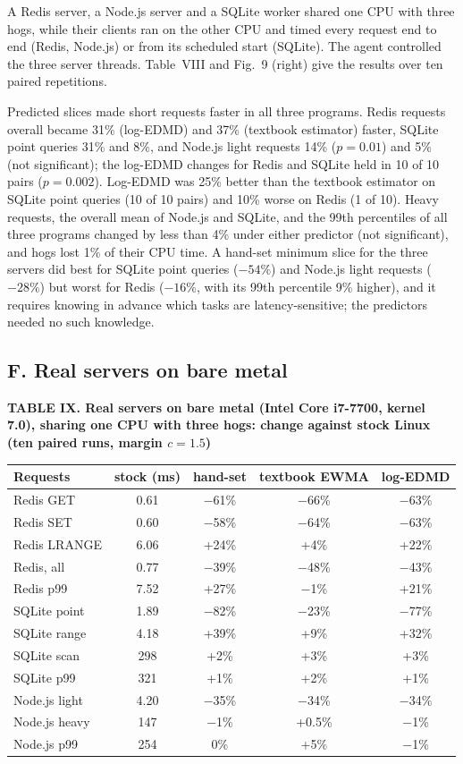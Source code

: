 \documentclass{article}
\begin{document}
A Redis server, a Node.js server and a SQLite worker shared one CPU with three hogs, while their clients ran on the other CPU and timed every request end to end (Redis, Node.js) or from its scheduled start (SQLite). The agent controlled the three server threads. Table~VIII and Fig.~9 (right) give the results over ten paired repetitions.

Predicted slices made short requests faster in all three programs. Redis requests overall became 31\% (log-EDMD) and 37\% (textbook estimator) faster, SQLite point queries 31\% and 8\%, and Node.js light requests 14\% ($p=0.01$) and 5\% (not significant); the log-EDMD changes for Redis and SQLite held in 10 of 10 pairs ($p=0.002$). Log-EDMD was 25\% better than the textbook estimator on SQLite point queries (10 of 10 pairs) and 10\% worse on Redis (1 of 10). Heavy requests, the overall mean of Node.js and SQLite, and the 99th percentiles of all three programs changed by less than 4\% under either predictor (not significant), and hogs lost 1\% of their CPU time. A hand-set minimum slice for the three servers did best for SQLite point queries ($-54\%$) and Node.js light requests ($-28\%$) but worst for Redis ($-16\%$, with its 99th percentile 9\% higher), and it requires knowing in advance which tasks are latency-sensitive; the predictors needed no such knowledge.

\subsection*{F. Real servers on bare metal}


\textbf{TABLE IX. Real servers on bare metal (Intel Core i7-7700, kernel 7.0), sharing one CPU with three hogs: change against stock Linux (ten paired runs, margin $c=1.5$)}




\begin{tabular}{lcccc}
\toprule
Requests & stock (ms) & hand-set & textbook EWMA & log-EDMD \\
\midrule
Redis GET & 0.61 & −61\% & −66\% & −63\% \\
Redis SET & 0.60 & −58\% & −64\% & −63\% \\
Redis LRANGE & 6.06 & +24\% & +4\% & +22\% \\
Redis, all & 0.77 & −39\% & −48\% & −43\% \\
Redis p99 & 7.52 & +27\% & −1\% & +21\% \\
SQLite point & 1.89 & −82\% & −23\% & −77\% \\
SQLite range & 4.18 & +39\% & +9\% & +32\% \\
SQLite scan & 298 & +2\% & +3\% & +3\% \\
SQLite p99 & 321 & +1\% & +2\% & +1\% \\
Node.js light & 4.20 & −35\% & −34\% & −34\% \\
Node.js heavy & 147 & −1\% & +0.5\% & −1\% \\
Node.js p99 & 254 & 0\% & +5\% & −1\% \\
\bottomrule
\end{tabular}
\end{document}

